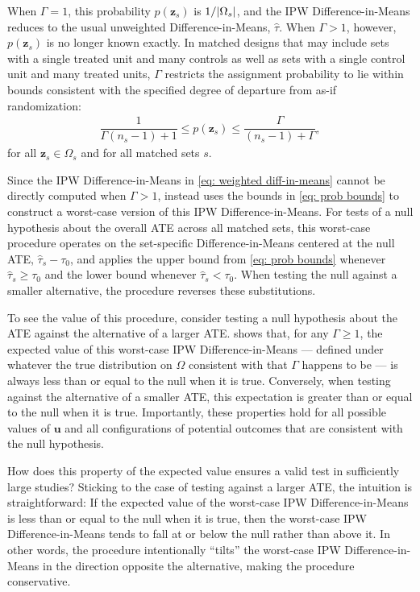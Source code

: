 \documentclass[
  12pt,
  leqno]{article}
\DeclarePairedDelimiter\abs{\lvert}{\rvert}
\begin{document}
When \(\Gamma = 1\), this probability \(p(\bm{z}_s)\) is
\(1/\abs{\Omega_s}\), and the IPW Difference-in-Means reduces to the
usual unweighted Difference-in-Means, \(\hat{\tau}\). When
\(\Gamma > 1\), however, \(p(\bm{z}_s)\) is no longer known exactly. In
matched designs that may include sets with a single treated unit and
many controls as well as sets with a single control unit and many
treated units, \(\Gamma\) restricts the assignment probability to lie
within bounds consistent with the specified degree of departure from
as-if randomization: \begin{align} \label{eq: prob bounds}
\dfrac{1}{\Gamma (n_s - 1) + 1} \leq p(\bm{z}_s) \leq \dfrac{\Gamma}{(n_s - 1) + \Gamma},
\end{align} for all \(\bm{z}_s \in \Omega_s\) and for all matched sets
\(s\).

Since the IPW Difference-in-Means in \eqref{eq: weighted diff-in-means}
cannot be directly computed when \(\Gamma > 1\), \citet{fogarty2023}
instead uses the bounds in \eqref{eq: prob bounds} to construct a
worst-case version of this IPW Difference-in-Means. For tests of a null
hypothesis about the overall ATE across all matched sets, this
worst-case procedure operates on the set-specific Difference-in-Means
centered at the null ATE, \(\hat{\tau}_s - \tau_0\), and applies the
upper bound from \eqref{eq: prob bounds} whenever
\(\hat{\tau}_s \geq \tau_0\) and the lower bound whenever
\(\hat{\tau}_s < \tau_0\). When testing the null against a smaller
alternative, the procedure reverses these substitutions.

To see the value of this procedure, consider testing a null hypothesis
about the ATE against the alternative of a larger ATE.
\citet{fogarty2023} shows that, for any \(\Gamma \geq 1\), the expected
value of this worst-case IPW Difference-in-Means --- defined under
whatever the true distribution on \(\Omega\) consistent with that
\(\Gamma\) happens to be --- is always less than or equal to the null
when it is true. Conversely, when testing against the alternative of a
smaller ATE, this expectation is greater than or equal to the null when
it is true. Importantly, these properties hold for all possible values
of \(\bm{u}\) and all configurations of potential outcomes that are
consistent with the null hypothesis.

How does this property of the expected value ensures a valid test in
sufficiently large studies? Sticking to the case of testing against a
larger ATE, the intuition is straightforward: If the expected value of
the worst-case IPW Difference-in-Means is less than or equal to the null
when it is true, then the worst-case IPW Difference-in-Means tends to
fall at or below the null rather than above it. In other words, the
procedure intentionally ``tilts'' the worst-case IPW Difference-in-Means
in the direction opposite the alternative, making the procedure
conservative.
\end{document}
